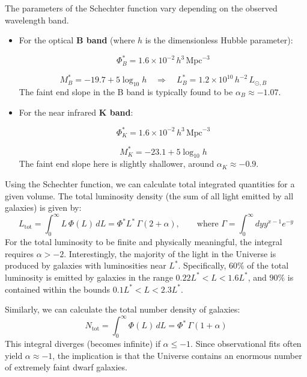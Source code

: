 \begin{exampleblock}
The parameters of the Schechter function vary depending on the observed wavelength band.

\begin{itemize}
\item For the optical \textbf{B band} (where $h$ is the dimensionless Hubble parameter):

\vspace{-0.5em}

$$
\Phi^*_B = 1.6 \times 10^{-2} \, h^3 \, \mathrm{Mpc}^{-3}
$$

\vspace{-0.8em}

$$
M^*_B = -19.7 + 5 \log_{10} h \quad \Rightarrow \quad L^*_B = 1.2 \times 10^{10} \, h^{-2} \, L_{\odot, B}
$$
The faint end slope in the B band is typically found to be $\alpha_B \approx -1.07$.

\item For the near infrared \textbf{K band}:

\vspace{-0.5em}

$$
\Phi^*_K = 1.6 \times 10^{-2} \, h^3 \, \mathrm{Mpc}^{-3}
$$

\vspace{-0.8em}

$$
M^*_K = -23.1 + 5 \log_{10} h
$$
The faint end slope here is slightly shallower, around $\alpha_K \approx -0.9$.
\end{itemize}
\end{exampleblock}

Using the Schechter function, we can calculate total integrated quantities for a given volume. The total luminosity density (the sum of all light emitted by all galaxies) is given by:
$$
L_{\mathrm{tot}} = \int_0^\infty L \, \Phi(L) \, dL = \Phi^* L^* \, \Gamma(2 + \alpha), \qquad \text{where } \Gamma = \int_0^\infty dy y^{x-1}e^{-y}
$$
For the total luminosity to be finite and physically meaningful, the integral requires $\alpha > -2$. Interestingly, the majority of the light in the Universe is produced by galaxies with luminosities near $L^*$. Specifically, $60\%$ of the total luminosity is emitted by galaxies in the range $0.22 L^* < L < 1.6 L^*$, and $90\%$ is contained within the bounds $0.1 L^* < L < 2.3 L^*$.

Similarly, we can calculate the total number density of galaxies:
$$
N_{\mathrm{tot}} = \int_0^\infty \Phi(L) \, dL = \Phi^* \, \Gamma(1 + \alpha)
$$
This integral diverges (becomes infinite) if $\alpha \leq -1$. Since observational fits often yield $\alpha \approx -1$, the implication is that the Universe contains an enormous number of extremely faint dwarf galaxies.

